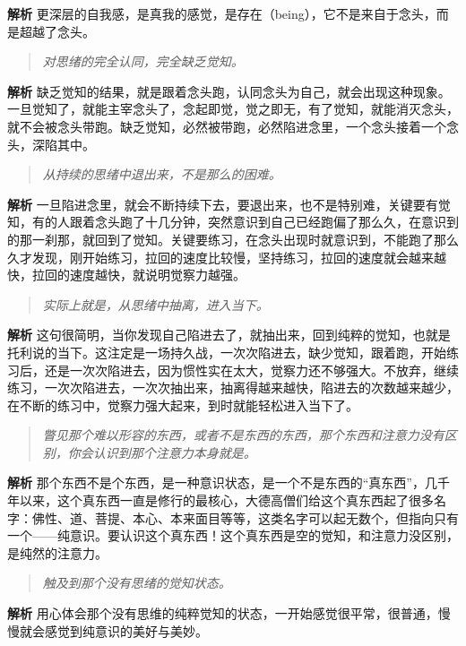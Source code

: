 \textbf{解析} 更深层的自我感，是真我的感觉，是存在（being），它不是来自于念头，而是超越了念头。

\begin{quote}\it
    对思绪的完全认同，完全缺乏觉知。
\end{quote}

\textbf{解析} 缺乏觉知的结果，就是跟着念头跑，认同念头为自己，就会出现这种现象。一旦觉知了，就能主宰念头了，念起即觉，觉之即无，有了觉知，就能消灭念头，就不会被念头带跑。缺乏觉知，必然被带跑，必然陷进念里，一个念头接着一个念头，深陷其中。

\begin{quote}\it
    从持续的思绪中退出来，不是那么的困难。
\end{quote}

\textbf{解析} 一旦陷进念里，就会不断持续下去，要退出来，也不是特别难，关键要有觉知，有的人跟着念头跑了十几分钟，突然意识到自己已经跑偏了那么久，在意识到的那一刹那，就回到了觉知。关键要练习，在念头出现时就意识到，不能跑了那么久才发现，刚开始练习，拉回的速度比较慢，坚持练习，拉回的速度就会越来越快，拉回的速度越快，就说明觉察力越强。

\begin{quote}\it
    实际上就是，从思绪中抽离，进入当下。
\end{quote}

\textbf{解析} 这句很简明，当你发现自己陷进去了，就抽出来，回到纯粹的觉知，也就是托利说的当下。这注定是一场持久战，一次次陷进去，缺少觉知，跟着跑，开始练习后，还是一次次陷进去，因为惯性实在太大，觉察力还不够强大。不放弃，继续练习，一次次陷进去，一次次抽出来，抽离得越来越快，陷进去的次数越来越少，在不断的练习中，觉察力强大起来，到时就能轻松进入当下了。

\begin{quote}\it
    瞥见那个难以形容的东西，或者不是东西的东西，那个东西和注意力没有区别，你会认识到那个注意力本身就是。
\end{quote}

\textbf{解析} 那个东西不是个东西，是一种意识状态，是一个不是东西的“真东西”，几千年以来，这个真东西一直是修行的最核心，大德高僧们给这个真东西起了很多名字：佛性、道、菩提、本心、本来面目等等，这类名字可以起无数个，但指向只有一个——纯意识。要认识这个真东西！这个真东西是空的觉知，和注意力没区别，是纯然的注意力。

\begin{quote}\it
    触及到那个没有思绪的觉知状态。
\end{quote}

\textbf{解析} 用心体会那个没有思维的纯粹觉知的状态，一开始感觉很平常，很普通，慢慢就会感觉到纯意识的美好与美妙。

